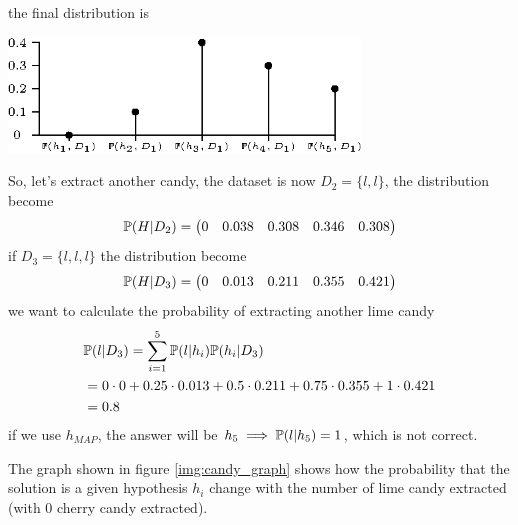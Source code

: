 \documentclass[10pt, letterpaper]{report}
\begin{document}
the final distribution is
\begin{center}
    \includegraphics[width=0.7\textwidth]{images/distr_candy.eps}
\end{center}
So, let's extract another candy, the dataset is now $D_2=\{l,l\}$, the distribution become\begin{equation}
    {\mathbb P}(H|D_2) = \begin{pmatrix}
        0&0.038&0.308&0.346&0.308
    \end{pmatrix}
\end{equation}
if $D_3=\{l,l,l\}$ the distribution become\begin{equation}
    {\mathbb P}(H|D_3) = \begin{pmatrix}
        0&0.013&0.211&0.355&0.421
    \end{pmatrix}
\end{equation}
we want to calculate the probability of extracting another lime candy\begin{align*}
    &{\mathbb P}(l|D_3)=\sum_{i=1}^5{\mathbb P}(l|h_i){\mathbb P}(h_i|D_3)\\
    &= 0 \cdot 0 + 0.25 \cdot 0.013 + 0.5 \cdot 0.211 + 0.75 \cdot 0.355 + 1 \cdot 0.421\\
    &=0.8
\end{align*}
if we use $h_{MAP}$, the answer will be $h_5\implies {\mathbb P}(l|h_5)=1$, which is not correct.\bigskip

The graph shown in figure \ref{img:candy_graph} shows how the probability that the solution is a given hypothesis $h_i$ change with the number of lime candy extracted (with 0 cherry candy extracted).
\end{document}
